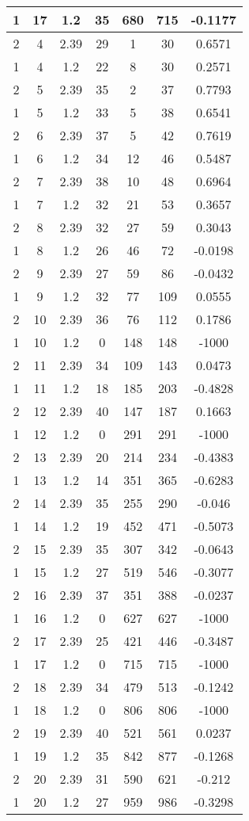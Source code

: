 \documentclass[letterpaper, 12pt]{article}
\begin{document}
\begin{longtable}{|c|c|c|c|c|c|c|}
\hline
1 & 17 & 1.2 & 35 & 680 & 715 & -0.1177 \\
\hline
2 & 4 & 2.39 & 29 & 1 & 30 & 0.6571 \\
\hline
1 & 4 & 1.2 & 22 & 8 & 30 & 0.2571 \\
\hline
2 & 5 & 2.39 & 35 & 2 & 37 & 0.7793 \\
\hline
1 & 5 & 1.2 & 33 & 5 & 38 & 0.6541 \\
\hline
2 & 6 & 2.39 & 37 & 5 & 42 & 0.7619 \\
\hline
1 & 6 & 1.2 & 34 & 12 & 46 & 0.5487 \\
\hline
2 & 7 & 2.39 & 38 & 10 & 48 & 0.6964 \\
\hline
1 & 7 & 1.2 & 32 & 21 & 53 & 0.3657 \\
\hline
2 & 8 & 2.39 & 32 & 27 & 59 & 0.3043 \\
\hline
1 & 8 & 1.2 & 26 & 46 & 72 & -0.0198 \\
\hline
2 & 9 & 2.39 & 27 & 59 & 86 & -0.0432 \\
\hline
1 & 9 & 1.2 & 32 & 77 & 109 & 0.0555 \\
\hline
2 & 10 & 2.39 & 36 & 76 & 112 & 0.1786 \\
\hline
1 & 10 & 1.2 & 0 & 148 & 148 & -1000 \\
\hline
2 & 11 & 2.39 & 34 & 109 & 143 & 0.0473 \\
\hline
1 & 11 & 1.2 & 18 & 185 & 203 & -0.4828 \\
\hline
2 & 12 & 2.39 & 40 & 147 & 187 & 0.1663 \\
\hline
1 & 12 & 1.2 & 0 & 291 & 291 & -1000 \\
\hline
2 & 13 & 2.39 & 20 & 214 & 234 & -0.4383 \\
\hline
1 & 13 & 1.2 & 14 & 351 & 365 & -0.6283 \\
\hline
2 & 14 & 2.39 & 35 & 255 & 290 & -0.046 \\
\hline
1 & 14 & 1.2 & 19 & 452 & 471 & -0.5073 \\
\hline
2 & 15 & 2.39 & 35 & 307 & 342 & -0.0643 \\
\hline
1 & 15 & 1.2 & 27 & 519 & 546 & -0.3077 \\
\hline
2 & 16 & 2.39 & 37 & 351 & 388 & -0.0237 \\
\hline
1 & 16 & 1.2 & 0 & 627 & 627 & -1000 \\
\hline
2 & 17 & 2.39 & 25 & 421 & 446 & -0.3487 \\
\hline
1 & 17 & 1.2 & 0 & 715 & 715 & -1000 \\
\hline
2 & 18 & 2.39 & 34 & 479 & 513 & -0.1242 \\
\hline
1 & 18 & 1.2 & 0 & 806 & 806 & -1000 \\
\hline
2 & 19 & 2.39 & 40 & 521 & 561 & 0.0237 \\
\hline
1 & 19 & 1.2 & 35 & 842 & 877 & -0.1268 \\
\hline
2 & 20 & 2.39 & 31 & 590 & 621 & -0.212 \\
\hline
1 & 20 & 1.2 & 27 & 959 & 986 & -0.3298 \\
\hline
\end{longtable}
\end{document}
